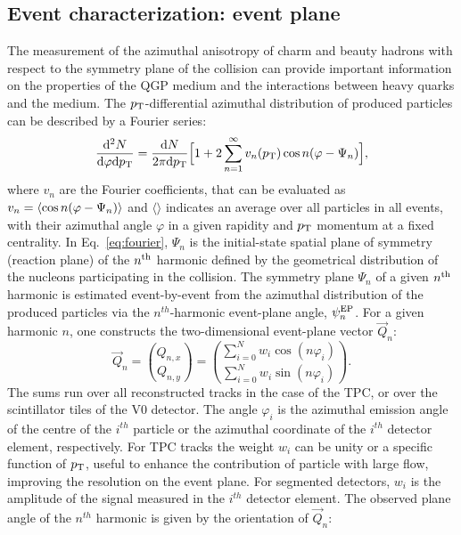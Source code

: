 \subsection{Event characterization: event plane}
\label{sec:EventPlane}
The measurement of the azimuthal anisotropy of charm and beauty hadrons
with respect to the symmetry plane of the collision can provide important information on the properties of the QGP medium 
and the interactions between heavy quarks and the medium.
The $p_{\rm T}$-differential azimuthal distribution of produced particles can be described by a Fourier series:
\begin{equation}
\label{eq:fourier}
\frac{{\rm d}^2N}{{\rm d} \varphi {\rm d}p_{\rm T}} =  \frac{{\rm d}N}{2\pi {\rm d}p_{\rm T}} \Big [ 1+ 2 \sum_{n=1}^{\infty} v_n(p_{\rm T}) \,{\rm cos} \,n(\varphi- \Psi_n)\Big ], 
\end{equation}
where $v_n$ are the Fourier coefficients, that can be evaluated as 
$v_n = \langle {\rm cos} \, n(\varphi - \Psi_n)\rangle$ and $\langle \rangle$ indicates an average over 
 all particles in all events, with their azimuthal angle $\varphi$ in a given rapidity and $p_{\rm T}$ 
 momentum at a fixed centrality. In Eq.~\ref{eq:fourier},
$\Psi_n$ is the initial-state spatial plane of symmetry (reaction plane) of
 the $n^{\rm th}$ harmonic defined by the geometrical distribution of the nucleons participating in the collision.
The symmetry plane $\Psi_n$ of a given $n^{\rm th}$ harmonic is estimated 
 event-by-event from the azimuthal distribution of the produced particles
via the $n^{th}$-harmonic event-plane angle, $\psi_n^{\rm EP}$.
For a given harmonic $n$, one constructs the two-dimensional event-plane 
vector $\vec{Q}_n$:
\begin{equation}
\label{eq:qvector}
 \vec{Q}_n= {Q_{n,x} \choose Q_{n,y}} = {\sum_{i=0}^{N} w_i \cos (n\varphi_i) \choose \sum_{i=0}^{N} w_i \sin (n\varphi_i)}.
\end{equation}
The sums run over all reconstructed tracks in the case 
of the TPC, or over the scintillator tiles of the V0 detector.
The angle $\varphi_i$ is the azimuthal emission angle of the centre of the $i^{th}$ particle or the 
azimuthal coordinate of the $i^{th}$ detector element, respectively. 
For TPC tracks the weight $w_i$ can be unity or a specific 
function of $p_{\rm T}$, useful to enhance the 
contribution of particle with large flow, improving 
the resolution on the event plane. For segmented detectors, $w_i$ is the amplitude of the 
signal measured in the $i^{th}$ detector element. The observed plane 
angle of the $n^{th}$ harmonic is given by the orientation of $\vec{Q}_n$:
